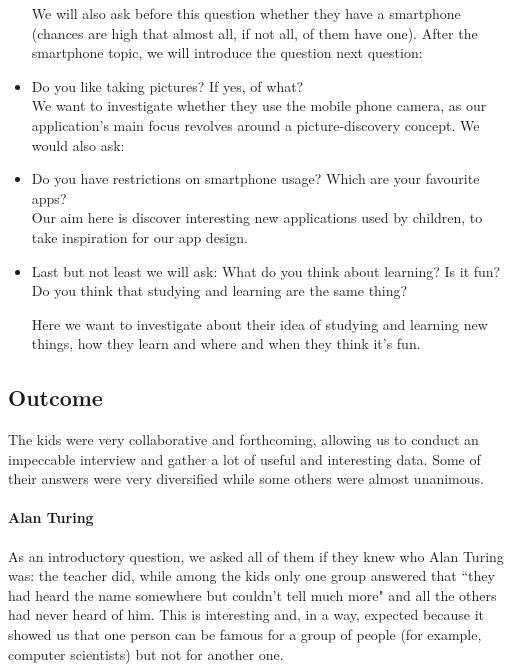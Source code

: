 \documentclass[12pt]{scrartcl}
\begin{document}
\begin{itemize}
		We will also ask before this question whether they have a smartphone (chances are high that 
		almost all, if not all, of them have one). After the smartphone topic, we will introduce the 
		question next question:

		\item Do you like taking pictures? If yes, of what?\\
		We want to investigate whether they use the mobile phone camera, as our application's main 
		focus revolves around a picture-discovery concept. We would also ask:

		\item Do you have restrictions on smartphone usage? Which are your favourite apps?\\
		Our aim here is discover interesting new applications used by children, to take inspiration for 
		our app design.

		\item Last but not least we will ask: What do you think about learning? Is it fun? 
		Do you think that studying and learning are the same thing?

		Here we want to investigate about their idea of studying and learning new things, how they 
		learn and where and when they think it's fun.
	\end{itemize}
		
	\subsection*{Outcome}
		The kids were very collaborative and forthcoming, allowing us to conduct an impeccable interview and gather a lot of useful and interesting data. Some of their answers were very diversified while some others were almost unanimous.
		
		\paragraph{Alan Turing} As an introductory question, we asked all of them if they knew who Alan Turing was: the teacher did, while among the kids only one group answered that ``they had heard the name somewhere but couldn't tell much more" and all the others had never heard of him. This is interesting and, in a way, expected because it showed us that one person can be famous for a group of people (for example, computer scientists) but not for another one.
		
\end{document}
